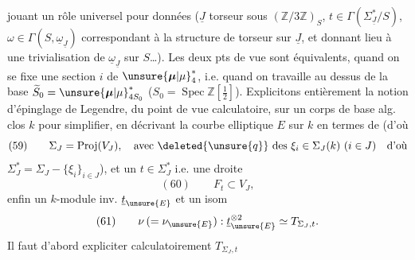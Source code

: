 jouant un rôle universel pour  données
($\underline J$ torseur sous $(\mathbb Z/3\mathbb Z)_S$, $t\in\Gamma(\Sigma_{\underline J}^*/S)$,
$\omega\in\Gamma(S,\underline\omega_{\underline J})$
correspondant à la structure de torseur sur $\underline J$,
et donnant lieu à une trivialisation de
$\underline\omega_{\underline J}$ sur $S$\ldots). Les deux pts de
vue sont équivalents, quand on se fixe
une section $i$ de $\unsure{\boldsymbol{\mu}|\mu}_4^*$, i.e. quand on
travaille au dessus de la base $\widetilde S_0=\unsure{\boldsymbol{\mu}|\mu}_{4S_0}^*$
($S_0=\operatorname{Spec}\mathbb Z[\frac12]$).
Explicitons entièrement la notion d'épinglage de
Legendre, du point de vue calculatoire, sur un
corps de base alg. clos $k$ pour simplifier, en
décrivant la courbe elliptique $E$ sur $k$ en termes
de
(d'où
\[
(59)\qquad\Sigma_J=\operatorname{Proj}(V_J),\quad\text{avec }\deleted{\unsure{q}}\text{ des }\xi_i\in\Sigma_J(k)\ (i\in J)\quad\text{d'où}
\]
$\Sigma_J^*=\Sigma_J-\{\xi_i\}_{i\in J}$), et un $t\in\Sigma_J^*$ i.e. une
droite
\[
(60)\qquad F_t\subset V_J,
\]
enfin un $k$-module inv. $\underline t_{\unsure{E}}$  et un isom
\[
(61)\qquad \nu\,(=\nu_{\unsure{E}}):\underline t_{\unsure{E}}^{\otimes2}\simeq T_{\Sigma_J,t}.
\]
Il faut d'abord expliciter calculatoirement $T_{\Sigma_J,t}$

